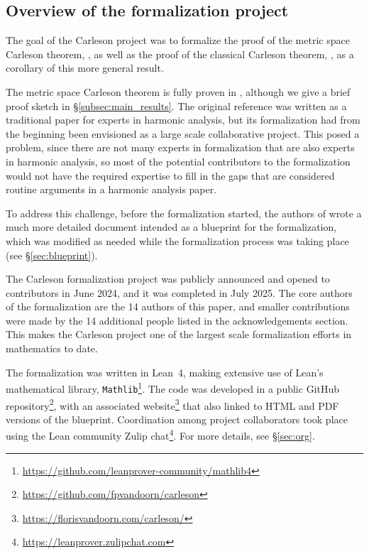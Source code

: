 \documentclass[12pt]{amsart}
\newcommand{\mathlib}{\texttt{Mathlib}\xspace}
\theoremstyle{definition}
\theoremstyle{plain}
\begin{document}
\subsection{Overview of the formalization project}\label{subsec:overview}
The goal of the Carleson project was to formalize the proof of the metric space Carleson theorem, , as well as the proof of the classical Carleson theorem, , as a corollary of this more general result.

The metric space Carleson theorem is fully proven in \cite{ThieleCarlesonPreprint}, although we give a brief proof sketch in \S\ref{subsec:main_results}.
The original reference \cite{ThieleCarlesonPreprint} was written as a traditional paper for experts in harmonic analysis, but its formalization had from the beginning been envisioned as a large scale collaborative project. This posed a problem, since there are not many experts in formalization that are also experts in harmonic analysis, so most of the potential contributors to the formalization would not have the required expertise to fill in the gaps that are considered routine arguments in a harmonic analysis paper.

To address this challenge, before the formalization started, the authors of \cite{ThieleCarlesonPreprint} wrote a much more detailed document \cite{CarlesonBlueprint} intended as a blueprint for the formalization, which was modified as needed while the formalization process was taking place (see \S\ref{sec:blueprint}).

The Carleson formalization project was publicly announced and opened to contributors in June 2024, and it was completed in July 2025. The core authors of the formalization are the 14 authors of this paper, and smaller contributions were made by the 14 additional people listed in the acknowledgements section. This makes the Carleson project one of the largest scale formalization efforts in mathematics to date.

The formalization was written in Lean~4, making extensive use of Lean's mathematical library, \mathlib\footnote{\url{https://github.com/leanprover-community/mathlib4}}.
The code was developed in a public GitHub repository\footnote{\url{https://github.com/fpvandoorn/carleson}}, with an associated website\footnote{\url{https://florisvandoorn.com/carleson/}} that also linked to HTML and PDF versions of the blueprint. Coordination among project collaborators took place using the Lean community Zulip chat\footnote{\url{https://leanprover.zulipchat.com}}. For more details, see \S\ref{sec:org}.
\end{document}
